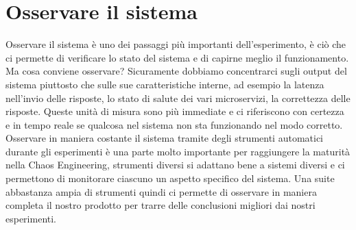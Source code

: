 \section{Osservare il sistema}
Osservare il sistema è uno dei passaggi più importanti dell'esperimento, è ciò che ci permette di verificare lo stato del sistema e di capirne meglio il funzionamento.
Ma cosa conviene osservare? Sicuramente dobbiamo concentrarci sugli output del sistema piuttosto che sulle sue caratteristiche interne, ad esempio la latenza nell'invio delle risposte, lo stato di salute dei vari microservizi, la correttezza delle risposte.
Queste unità di misura sono più immediate e ci riferiscono con certezza e in tempo reale se qualcosa nel sistema non sta funzionando nel modo corretto.
Osservare in maniera costante il sistema tramite degli strumenti automatici durante gli esperimenti è una parte molto importante per raggiungere la maturità nella Chaos Engineering, strumenti diversi si adattano bene a sistemi diversi e ci permettono di monitorare ciascuno un aspetto specifico del sistema.
Una suite abbastanza ampia di strumenti quindi ci permette di osservare in maniera completa il nostro prodotto per trarre delle conclusioni migliori dai nostri esperimenti.

